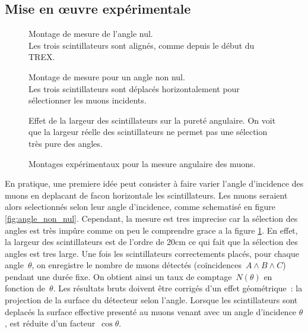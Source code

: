 \documentclass[a4paper,12pt,twoside]{article}
\begin{document}
\subsection{Mise en œuvre expérimentale}

\begin{figure}[H]
  \begin{minipage}{0.3\textwidth}
    \centering
    
    \caption{Montage de mesure de l'angle nul.\\Les trois scintillateurs sont alignés, comme depuis le début du TREX.}
    \label{fig:angle_nul}
  \end{minipage}
  \hfill
  \begin{minipage}
  {0.3\textwidth}
    \centering
    
    \caption{Montage de mesure pour un angle non nul.\\Les trois scintillateurs sont déplacés horizontalement pour sélectionner les muons incidents.}
    \label{fig:angle_non_nul}
  \end{minipage}
  \hfill
  \begin{minipage}{0.3\textwidth}
    \centering
    
    \caption{Effet de la largeur des scintillateurs sur la pureté angulaire. On voit que la largeur réelle des scintillateurs ne permet pas une sélection très pure des angles.}
    \label{fig:range_des_angles}
  \end{minipage}
  \caption{Montages expérimentaux pour la mesure angulaire des muons.}
\end{figure}


En pratique, une premiere idée peut consister à faire varier l'angle d'incidence des muons en deplacant de facon horizontale les scintillateurs.
Les muons seraient alors selectionnés selon leur angle d'incidence, comme schematisé en figure \ref{fig:angle_non_nul}.
Cependant, la mesure est tres imprecise car la sélection des angles est très impûre comme on peu le comprendre grace a la figure \ref{fig:range_des_angles}.
En effet, la largeur des scintillateurs est de l'ordre de 20cm ce qui fait que la sélection des angles est tres large.
Une fois les scintillateurs correctements placés, pour chaque angle~$\theta$, on enregistre le nombre de muons détectés (coïncidences $A\wedge B\wedge C$) pendant une durée fixe. On obtient ainsi un taux de comptage~$N(\theta)$ en fonction de~$\theta$. Les résultats bruts doivent être corrigés d'un effet géométrique~: la projection de la surface du détecteur selon l'angle. Lorsque les scintillateurs sont deplacés la surface effective presenté au muons venant avec un angle d'incidence $\theta$, est réduite d'un facteur~$\cos\theta$. 
\end{document}
